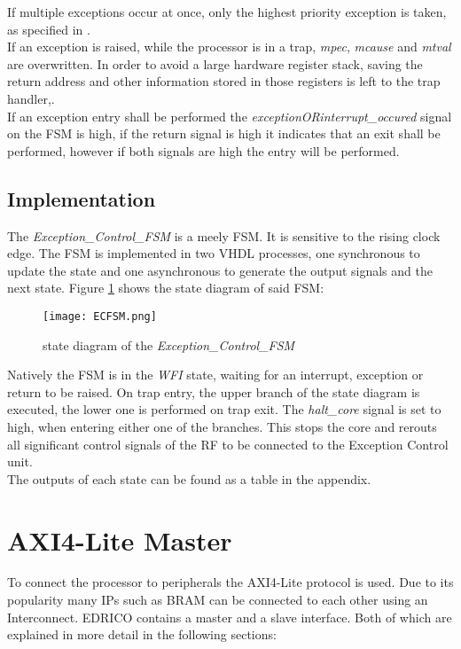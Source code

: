 If multiple exceptions occur at once, only the highest priority exception is taken, as specified in \cite{riscv:privileged}.\\
If an exception is raised, while the processor is in a trap, \textit{mpec}, \textit{mcause} and \textit{mtval} are overwritten. In order to avoid a large hardware register stack, saving the return address and other information stored in those registers is left to the trap handler,.\\
If an exception entry shall be performed the \textit{exceptionORinterrupt\_occured} signal on the FSM is high, if the return signal is high it indicates that an exit shall be performed, however if both signals are high the entry will be performed.
\clearpage
\subsection{Implementation}
The \textit{Exception\_Control\_FSM} is a meely \ac{FSM}. It is sensitive to the rising clock edge. The \ac{FSM} is implemented in two \ac{VHDL} processes, one synchronous to update the state and one asynchronous to generate the output signals and the next state. Figure \ref{fig:ECFSM} shows the state diagram of said \ac{FSM}:
\begin{figure}[H]
	\centering
	\texttt{[image: ECFSM.png]}
	\caption{state diagram of the \textit{Exception\_Control\_FSM}}
	\label{fig:ECFSM}
\end{figure}
Natively the \ac{FSM} is in the \textit{WFI} state, waiting for an interrupt, exception or return to be raised. On trap entry, the upper branch of the state diagram is executed, the lower one is performed on trap exit. The \textit{halt\_core} signal is set to high, when entering either one of the branches. This stops the core and rerouts all significant control signals of the \ac{RF} to be connected to the Exception Control unit.\\
The outputs of each state can be found as a table in the appendix. 


\clearpage
\section{AXI4-Lite Master}
To connect the processor to peripherals the \ac{AXI4-Lite} protocol is used. Due to its
popularity many \acp{IP} such as \ac{BRAM} can be connected to each other using an
Interconnect. \ac{EDRICO} contains a master and a slave interface. Both of which are
explained in more detail in the following sections:
